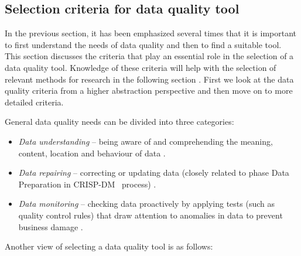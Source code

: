     	\subsection{Selection criteria for data quality tool}
    	\label{subsec:selection_criteria_for_data_quality_tool}
    	
    		In the previous section, it has been emphasized several times that it is important to first understand the needs of data quality and then to find a suitable tool. This section discusses the criteria that play an essential role in the selection of a data quality tool. Knowledge of these criteria will help with the selection of relevant methods for research in the following section . First we look at the data quality criteria from a higher abstraction perspective and then move on to more detailed criteria.
													
			General data quality needs can be divided into three categories:			
				\begin{itemize}
					\item \textit{Data understanding} -- being aware of and comprehending the meaning, content, location and behaviour of data \cite{McGilvray2008}.
					\item \textit{Data repairing} -- correcting or updating data (closely related to phase Data Preparation in CRISP-DM ~process) \cite{McGilvray2008}.
					\item \textit{Data monitoring} -- checking data proactively by applying tests (such as quality control rules) that draw attention to anomalies in data to prevent business damage \cite{McGilvray2008}.
				\end{itemize}	
						
			Another view of selecting a data quality tool is as follows:	
				
